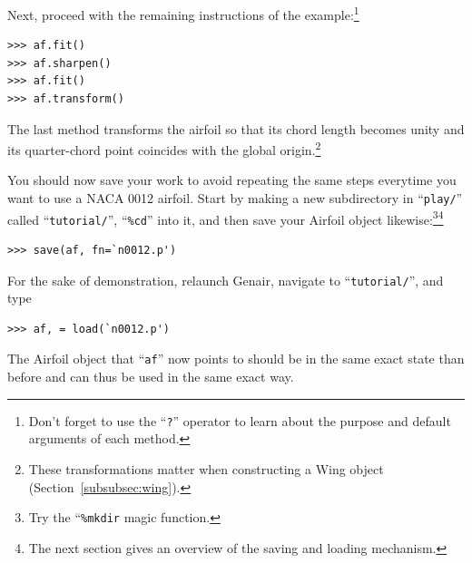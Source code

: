 \documentclass[]{article}
\begin{document}
Next, proceed with the remaining instructions of the 
example:\footnote{Don't forget to use the ``\texttt{?}'' operator to 
learn about the purpose and default arguments of each method.}
\begin{verbatim}
>>> af.fit()
>>> af.sharpen()
>>> af.fit()
>>> af.transform()
\end{verbatim}
The last method transforms the airfoil so that its chord length becomes 
unity and its quarter-chord point coincides with the global 
origin.\footnote{These transformations matter when constructing a Wing 
object (Section~\ref{subsubsec:wing}).}

You should now save your work to avoid repeating the same steps 
everytime you want to use a NACA 0012 airfoil.  Start by making a new 
subdirectory in ``\texttt{play/}'' called ``\texttt{tutorial/}'', 
``\texttt{\%cd}'' into it, and then save your Airfoil object 
likewise:\footnote{Try the ``\texttt{\%mkdir} magic 
function.}\footnote{The next section gives an overview of the saving and 
loading mechanism.}
\begin{verbatim}
>>> save(af, fn=`n0012.p')
\end{verbatim}
For the sake of demonstration, relaunch Genair, navigate to 
``\texttt{tutorial/}'', and type
\begin{verbatim}
>>> af, = load(`n0012.p')
\end{verbatim}
The Airfoil object that ``\texttt{af}'' now points to should be in the 
same exact state than before and can thus be used in the same exact way.
\end{document}

